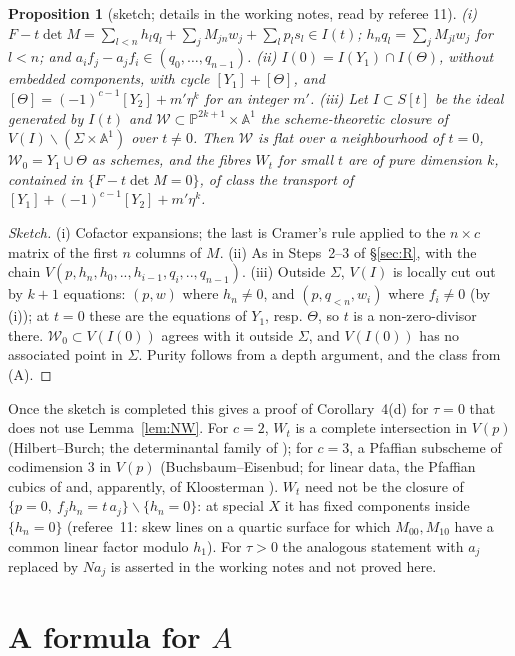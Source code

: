 \documentclass[11pt]{article}
\numberwithin{equation}{section}
\newtheorem{proposition}[theorem]{Proposition}
\theoremstyle{remark}
\newcommand{\PP}{\mathbb{P}}
\newcommand{\cW}{\mathcal{W}}
\begin{document}
\begin{proposition}[sketch; details in the working notes, read by referee 11]\label{prop:W}
(i) $F-t\det M=\sum_{l<n}h_lq_l+\sum_jM_{jn}w_j+\sum_l p_ls_l\in I(t)$; $h_nq_l=\sum_jM_{jl}w_j$ for $l<n$; and
$a_if_j-a_jf_i\in(q_0,\dots,q_{n-1})$. (ii) $I(0)=I(Y_1)\cap I(\Theta)$, without embedded components, with cycle
$[Y_1]+[\Theta]$, and $[\Theta]=(-1)^{c-1}[Y_2]+m'\eta^k$ for an integer $m'$. (iii) Let $I\subset S[t]$ be the ideal
generated by $I(t)$ and $\cW\subset\PP^{2k+1}\times\mathbb{A}^1$ the
scheme-theoretic closure of $V(I)\smallsetminus(\Sigma\times\mathbb{A}^1)$ over $t\neq0$. Then $\cW$ is flat over a
neighbourhood of $t=0$, $\cW_0=Y_1\cup\Theta$ as schemes, and the fibres $W_t$ for small $t$ are of pure dimension
$k$, contained in $\{F-t\det M=0\}$, of class the transport of $[Y_1]+(-1)^{c-1}[Y_2]+m'\eta^k$.
\end{proposition}
\begin{proof}[Sketch]
(i) Cofactor expansions; the last is Cramer's rule applied to the $n\times c$ matrix of the first $n$ columns of
$M$. (ii) As in Steps~2--3 of \S\ref{sec:R}, with the chain $V(p,h_n,h_0,..,h_{i-1},q_i,..,q_{n-1})$. (iii)
Outside $\Sigma$, $V(I)$ is locally cut out by $k+1$ equations: $(p,w)$ where $h_n\ne0$, and $(p,q_{<n},w_i)$ where
$f_i\neq0$ (by (i)); at $t=0$ these are the equations of $Y_1$, resp. $\Theta$, so $t$ is a non-zero-divisor there.
$\cW_0\subset V(I(0))$ agrees with it outside $\Sigma$, and $V(I(0))$ has no associated point in $\Sigma$. Purity follows
from a depth argument, and the class from (A).
\end{proof}

Once the sketch is completed this gives a proof of Corollary~4(d) for $\tau=0$ that does not use
Lemma~\ref{lem:NW}. For $c=2$, $W_t$ is a complete intersection in $V(p)$ (Hilbert--Burch; the determinantal
family of \cite{P2}); for $c=3$, a Pfaffian subscheme of codimension $3$ in $V(p)$ (Buchsbaum--Eisenbud; for
linear data, the Pfaffian cubics of \cite{P1} and, apparently, of Kloosterman \cite{Kl}). $W_t$ need not be the
closure of $\{p=0,\ f_jh_n=t\,a_j\}\smallsetminus\{h_n=0\}$: at special $X$ it has fixed components inside
$\{h_n=0\}$ (referee~11: skew lines on a quartic surface for which $M_{00},M_{10}$ have a common linear factor
modulo $h_1$). For $\tau>0$ the analogous statement with $a_j$ replaced by $Na_j$ is asserted in the working
notes and not proved here.

\section{A formula for \texorpdfstring{$A$}{A}}\label{sec:conj}
\end{document}
